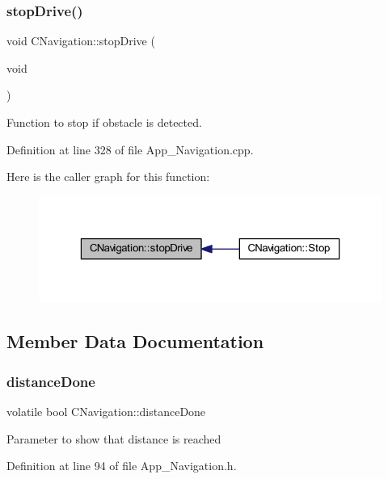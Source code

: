 \subsubsection{\texorpdfstring{stop\+Drive()}{stopDrive()}}
{\footnotesize\ttfamily void C\+Navigation\+::stop\+Drive (\begin{DoxyParamCaption}\item[{void}]{ }\end{DoxyParamCaption})\hspace{0.3cm}{\ttfamily [virtual]}}



Function to stop if obstacle is detected. 



Definition at line 328 of file App\+\_\+\+Navigation.\+cpp.

Here is the caller graph for this function\+:
\nopagebreak
\begin{figure}[H]
\begin{center}
\leavevmode
\includegraphics[width=323pt]{class_c_navigation_a06ce71124d487f1f9febf36a0e4b2a5d_icgraph}
\end{center}
\end{figure}


\subsection{Member Data Documentation}
\mbox{\label{class_c_navigation_af3f718b7aa00a149c31c5682113da75e}} 
\subsubsection{\texorpdfstring{distance\+Done}{distanceDone}}
{\footnotesize\ttfamily volatile bool C\+Navigation\+::distance\+Done}

Parameter to show that distance is reached 

Definition at line 94 of file App\+\_\+\+Navigation.\+h.

